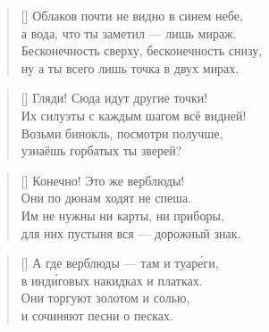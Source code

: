 \documentclass[a5paper,11pt]{memoir}
\begin{document}
\begin{verse}[\versewidth]
Облаков почти не видно в синем небе, \\
а вода, что ты заметил --- лишь мираж. \\
Бесконечность сверху, бесконечность снизу, \\
ну а ты всего лишь точка в двух мирах.
\end{verse}

\newpage


\color{white}
\begin{verse}[\versewidth]
Гляди! Сюда идут другие точки! \\
Их силуэты с каждым шагом всё видней! \\
Возьми бинокль, посмотри получше, \\
узнаёшь горбатых ты зверей?
\end{verse}

\begin{verse}[\versewidth]
Конечно! Это же верблюды! \\
Они по дюнам ходят не спеша. \\
Им не нужны ни карты, ни приборы, \\
для них пустыня вся --- дорожный знак.
\end{verse}

\begin{verse}[\versewidth]
А где верблюды --- там и туар\'{е}ги, \\
в инд\'{и}говых накидках и платках. \\
Они торгуют золотом и солью, \\
и сочиняют песни о песках.
\end{verse}
\end{document}

